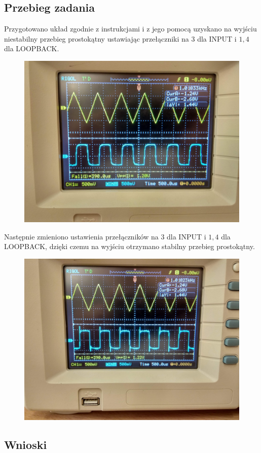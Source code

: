 \documentclass[polish,polish,a4paper]{article}
\begin{document}
\begin{spacing}{1.3}
\subsection{Przebieg zadania}

Przygotowano układ zgodnie z instrukcjami i z jego pomocą uzyskano na wyjściu niestabilny przebieg prostokątny ustawiając przełączniki na $3$ dla INPUT i $1,4$ dla LOOPBACK.

\begin{figure}[H]
	\centering
	\includegraphics[scale=0.1]{1611.jpg}
\end{figure}

Następnie zmieniono ustawienia przełączników na $3$ dla INPUT i $1,4$ dla LOOPBACK, dzięki czemu na  wyjściu otrzymano stabilny przebieg prostokątny.

\begin{figure}[H]
	\centering
	\includegraphics[scale=0.1]{1612.jpg}
\end{figure}


\subsection{Wnioski}


\end{spacing}
\end{document}
